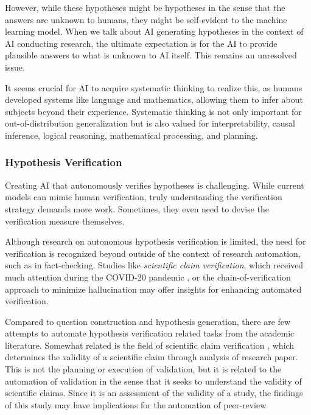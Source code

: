 However, while these hypotheses might be hypotheses in the sense that the answers are unknown to humans, they might be self-evident to the machine learning model. When we talk about AI generating hypotheses in the context of AI conducting research, the ultimate expectation is for the AI to provide plausible answers to what is unknown to AI itself. This remains an unresolved issue.

It seems crucial for AI to acquire systematic thinking to realize this, as humans developed systems like language and mathematics, allowing them to infer about subjects beyond their experience. Systematic thinking is not only important for out-of-distribution generalization but is also valued for interpretability, causal inference, logical reasoning, mathematical processing, and planning.


\subsubsection{Hypothesis Verification}

Creating AI that autonomously verifies hypotheses is challenging. While current models can mimic human verification, truly understanding the verification strategy demands more work. Sometimes, they even need to devise the verification measure themselves.

Although research on autonomous hypothesis verification is limited, the need for verification is recognized beyond outside of the context of research automation, such as in fact-checking. Studies like \textit{scientific claim verification}, which received much attention during the COVID-20 pandemic \cite{wadden2020fact}, or the chain-of-verification approach to minimize hallucination \cite{dhuliawala2023chain} may offer insights for enhancing automated verification.

Compared to question construction and hypothesis generation, there are few attempts to automate
hypothesis verification related tasks from the academic literature. Somewhat related is the field of
scientific claim verification \cite{li2019scientific,wadden2020fact,wadden2022scifact,wadden2022multivers,wang2023using}, which determines the validity of a scientific claim
through analysis of research paper. This is not the planning or execution of validation, but it is related
to the automation of validation in the sense that it seeks to understand the validity of scientific claims.
Since it is an assessment of the validity of a study, the findings of this study may have implications
for the automation of peer-review

